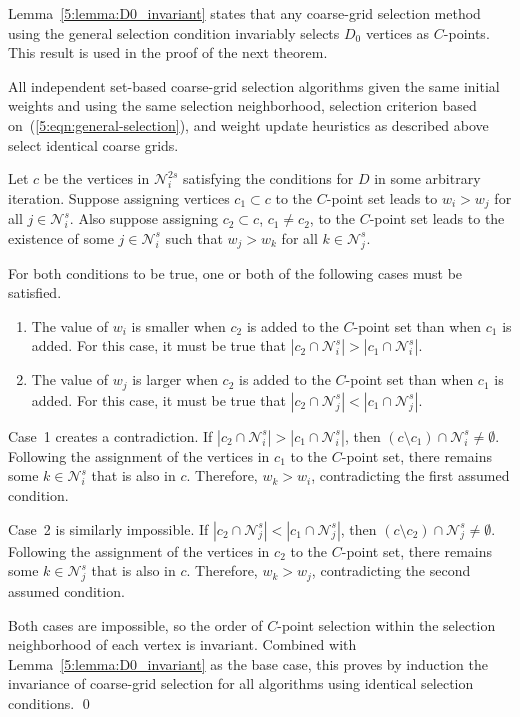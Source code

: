 \documentclass{elsart}
\newenvironment{proof}{\begin{pf}}{\qed\end{pf}}
\begin{document}
Lemma~\ref{5:lemma:D0_invariant} states that any coarse-grid selection
method using the general selection condition invariably selects $D_0$
vertices as $C$-points. This result is used in the proof of the next
theorem.

\begin{thm}
\label{5:theorem:invariance}
All independent set-based coarse-grid selection algorithms given the
same initial weights and using the same selection neighborhood,
selection criterion based on~(\ref{5:eqn:general-selection}), and
weight update heuristics as described above select identical coarse
grids.
\end{thm}
\begin{proof}
Let $c$ be the vertices in $\mathcal{N}_i^{2s}$ satisfying the
conditions for $D$ in some arbitrary iteration. Suppose assigning
vertices $c_1 \subset c$ to the $C$-point set leads to $w_i > w_j$ for
all $j \in \mathcal{N}_i^s$. Also suppose assigning $c_2 \subset c$,
$c_1 \ne c_2$, to the $C$-point set leads to the existence of some $j
\in \mathcal{N}_i^s$ such that $w_j > w_k$ for all $k \in
\mathcal{N}_j^s$.

For both conditions to be true, one or both of the following cases
must be satisfied.
\begin{enumerate}
\item The value of $w_i$ is smaller when $c_2$ is added to the
  $C$-point set than when $c_1$ is added. For this case, it must be
  true that $|c_2 \cap \mathcal{N}_i^s| > |c_1 \cap \mathcal{N}_i^s|$.
\item The value of $w_j$ is larger when $c_2$ is added to the
  $C$-point set than when $c_1$ is added. For this case, it must be
  true that $|c_2 \cap \mathcal{N}_j^s| < |c_1 \cap
  \mathcal{N}_j^s|$.
\end{enumerate}

Case~1 creates a contradiction. If $|c_2 \cap \mathcal{N}_i^s| > |c_1
\cap \mathcal{N}_i^s|$, then $(c \setminus c_1) \cap \mathcal{N}_i^s
\ne \emptyset$. Following the assignment of the vertices in $c_1$ to
the $C$-point set, there remains some $k \in \mathcal{N}_i^s$ that is
also in $c$. Therefore, $w_k > w_i$, contradicting the first assumed
condition.

Case~2 is similarly impossible. If $|c_2 \cap \mathcal{N}_j^s| < |c_1
\cap \mathcal{N}_j^s|$, then $(c \setminus c_2) \cap \mathcal{N}_j^s
\ne \emptyset$. Following the assignment of the vertices in $c_2$ to
the $C$-point set, there remains some $k \in \mathcal{N}_j^s$ that is
also in $c$. Therefore, $w_k > w_j$, contradicting the second assumed
condition.

Both cases are impossible, so the order of $C$-point selection within
the selection neighborhood of each vertex is invariant. Combined with
Lemma~\ref{5:lemma:D0_invariant} as the base case, this proves by
induction the invariance of coarse-grid selection for all algorithms
using identical selection conditions.
\end{proof}
\end{document}
